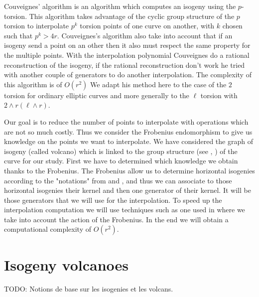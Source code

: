 \documentclass{article}
\newcommand{\todo}[1]{{\color{red}TODO: #1}}
\theoremstyle{plain}
\theoremstyle{definition}
\theoremstyle{remark}
\begin{document}

Couveignes' algorithm \cite{couveignes96} is an algorithm which computes an isogeny using the $p$-torsion. This algorithm takes advantage of the cyclic group structure of the $p$ torsion to interpolate $p^k$ torsion points of one curve on another, with $k$ chosen such that $p^k>4r$. Couveignes's algorithm also take into account that if an isogeny send a point on an other then it also must respect the same property for the multiple points. With the interpolation polynomial Couveignes do a rational reconstruction of the isogeny, if the rational reconstruction don't work he tried with another couple of generators to do another interpolation. The complexity of this algorithm is of $O(r^2)$
\newline
We adapt his method here to the case of the $2$ torsion for ordinary elliptic curves and more generally to the $\ell$ torsion with $2 \wedge r ( \ell \wedge r)$.

Our goal is to reduce the number of points to interpolate with operations which are not so much costly. Thus we consider the Frobenius endomorphism to give us knowledge on the points we want to interpolate. We have considered the graph of isogeny (called volcano) which is linked to the group structure (see \cite{MiretMRV05}, \cite{IonicaJ10} ) of the curve for our study. First we have to determined which knowledge we obtain thanks to the Frobenius. The Frobenius allow us to determine horizontal isogenies according to the "notations" from \cite{Kohel} and \cite{volcano}, and thus we can associate to those horizontal isogenies their kernel and then one generator of their kernel. It will be those generators that we will use for the interpolation. To speed up the interpolation computation we will use techniques such as one used in \cite{enge+morain03} where we take into account the action of the Frobenius. In the end we will obtain a computational complexity of $O(r^2)$.


\section{Isogeny volcanoes}
\label{sec:isogeny-volcanoes}

\todo{Notions de base sur les isogenies et les volcans.}
\end{document}

